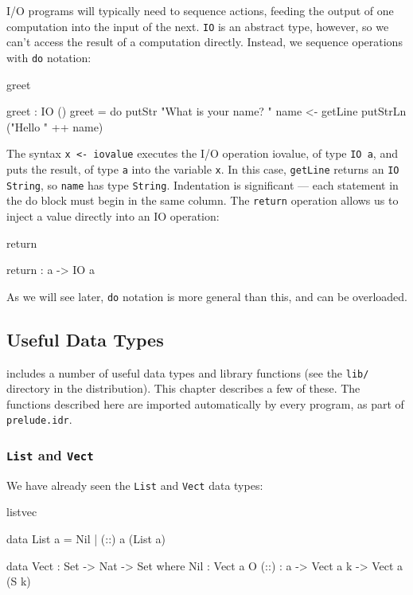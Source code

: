 I/O programs will typically need to sequence actions, feeding the output of one
computation into the input of the next. \texttt{IO} is an abstract type, however, so we
can't access the result of a computation directly. Instead, we sequence
operations with \texttt{do} notation:

\begin{SaveVerbatim}{greet}

greet : IO ()
greet = do putStr "What is your name? "
           name <- getLine
           putStrLn ("Hello " ++ name)

\end{SaveVerbatim}

\noindent
The syntax \texttt{x <- iovalue} executes the I/O operation iovalue, of type 
\texttt{IO a}, and
puts the result, of type \texttt{a} into the variable \texttt{x}. 
In this case, \texttt{getLine} returns an \texttt{IO String},
so \texttt{name} has type \texttt{String}. Indentation is significant --- each
statement in the do block must begin in the same column.
The \texttt{return} operation allows us to inject a value directly into an IO
operation:

\begin{SaveVerbatim}{return}

return : a -> IO a

\end{SaveVerbatim}

\noindent
As we will see later, \texttt{do} notation is more general than this, and can be
overloaded.

\subsection{Useful Data Types}

\Idris{} includes a number of useful data types and library functions (see the
\texttt{lib/} directory in the distribution). This chapter describes a few of these. The
functions described here are imported automatically by every \Idris{} program, as
part of \texttt{prelude.idr}.

\subsubsection{\texttt{List} and \texttt{Vect}}

We have already seen the \texttt{List} and \texttt{Vect} data types:

\begin{SaveVerbatim}{listvec}

data List a = Nil | (::) a (List a)

data Vect : Set -> Nat -> Set where
   Nil  : Vect a O
   (::) : a -> Vect a k -> Vect a (S k)

\end{SaveVerbatim}

